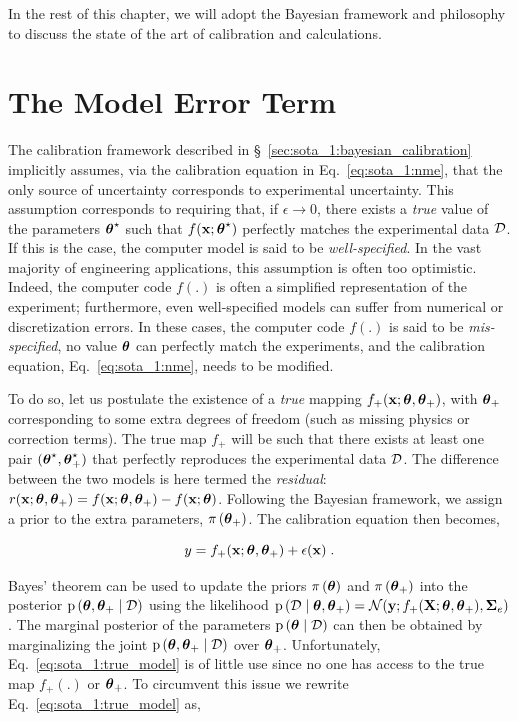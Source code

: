 \smallskip
In the rest of this chapter, we will adopt the Bayesian framework and philosophy to discuss the state of the art of calibration and calculations.


\section{The Model Error Term}
\label{sec:sota_1:model_error_term}

The calibration framework described in \S~\ref{sec:sota_1:bayesian_calibration} implicitly assumes, via the calibration equation in Eq.~\eqref{eq:sota_1:nme}, that the only source of uncertainty corresponds to experimental uncertainty. This assumption corresponds to requiring that, if $\epsilon \rightarrow 0$, there exists a \textit{true} value of the parameters $\boldsymbol{\theta}^\star$ such that $f(\mathbf{x}; \boldsymbol{\theta}^\star)$ perfectly matches the experimental data $\mathcal{D}$. If this is the case, the computer model is said to be \textit{well-specified}. In the vast majority of engineering applications, this assumption is often too optimistic. Indeed, the computer code $f(.)$ is often a simplified representation of the experiment; furthermore, even well-specified models can suffer from numerical or discretization errors. In these cases, the computer code $f(.)$ is said to be \textit{mis-specified}, no value $\boldsymbol{\theta}$ can perfectly match the experiments, and the calibration equation, Eq.~\eqref{eq:sota_1:nme}, needs to be modified.

\smallskip
To do so, let us postulate the existence of a \textit{true} mapping $f_+(\mathbf{x}; \boldsymbol{\theta}, \boldsymbol{\theta}_+)$, with $\boldsymbol{\theta}_+$ corresponding to some extra degrees of freedom (such as missing physics or correction terms). The true map $f_+$ will be such that there exists at least one pair $(\boldsymbol{\theta}^\star, \boldsymbol{\theta}_+^\star)$ that perfectly reproduces the experimental data $\mathcal{D}$. The difference between the two models is here termed the \textit{residual}: $r(\mathbf{x};\boldsymbol{\theta},\boldsymbol{\theta}_+) = f(\mathbf{x}; \boldsymbol{\theta}, \boldsymbol{\theta}_+) - f(\mathbf{x}; \boldsymbol{\theta})$. Following the Bayesian framework, we assign a prior to the extra parameters, $\pi \left( \boldsymbol{\theta}_+\right)$. The calibration equation then becomes,

\begin{equation}
    y = f_+(\mathbf{x}; \boldsymbol{\theta}, \boldsymbol{\theta}_+) + \epsilon(\mathbf{x}) \;.
    \label{eq:sota_1:true_model}
\end{equation}

Bayes' theorem can be used to update the priors $\pi \left( \boldsymbol{\theta}\right)$ and $\pi \left( \boldsymbol{\theta}_+\right)$ into the posterior $\mathrm{p} \left( \boldsymbol{\theta}, \boldsymbol{\theta}_+ \mid \mathcal{D} \right)$ using the likelihood $\mathrm{p} \left( \mathcal{D} \mid \boldsymbol{\theta}, \boldsymbol{\theta}_+ \right)=\mathcal{N}(\mathbf{y}; f_+(\mathbf{X};\boldsymbol{\theta},\boldsymbol{\theta}_+), \boldsymbol{\Sigma}_e)$. The marginal posterior of the parameters $\mathrm{p} \left( \boldsymbol{\theta} \mid \mathcal{D} \right)$ can then be obtained by marginalizing the joint $\mathrm{p} \left( \boldsymbol{\theta}, \boldsymbol{\theta}_+ \mid \mathcal{D} \right)$ over $\boldsymbol{\theta}_+$. 
Unfortunately, Eq.~\eqref{eq:sota_1:true_model} is of little use since no one has access to the true map $f_+(.)$ or $\boldsymbol{\theta}_+$. To circumvent this issue we rewrite Eq.~\eqref{eq:sota_1:true_model} as,

